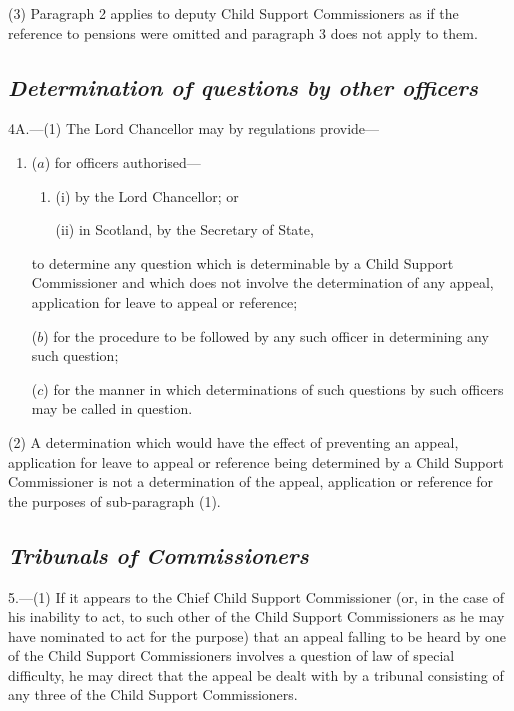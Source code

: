 \documentclass[12pt,a4paper]{article}
\begin{document}
(3) Paragraph 2 applies to deputy Child Support Commissioners as if the reference to pensions were omitted and paragraph 3 does not apply to them.


\subsection*{\itshape Determination of questions by other officers}

4A.---(1) The Lord Chancellor may by regulations provide—
\begin{enumerate}\item[]
($a$) for officers authorised—
\begin{enumerate}\item[]
(i) by the Lord Chancellor; or

(ii) in Scotland, by the Secretary of State,
\end{enumerate}
to determine any question which is determinable by a Child Support Commissioner and which does not involve the determination of any appeal, application for leave to appeal or reference;

($b$) for the procedure to be followed by any such officer in determining any such question;

($c$) for the manner in which determinations of such questions by such officers may be called in question.
\end{enumerate}

(2) A determination which would have the effect of preventing an appeal, application for leave to appeal or reference being determined by a Child Support Commissioner is not a determination of the appeal, application or reference for the purposes of sub-paragraph (1).


\subsection*{\itshape Tribunals of Commissioners}

5.---(1) If it appears to the Chief Child Support Commissioner (or, in the case of his inability to act, to such other of the Child Support Commissioners as he may have nominated to act for the purpose) 
that an appeal 
%
falling to be heard by one of the Child Support Commissioners involves a question of law of special difficulty, he may direct 
that the appeal 
be dealt with by a tribunal consisting of any three 
of the Child Support Commissioners.
\end{document}

